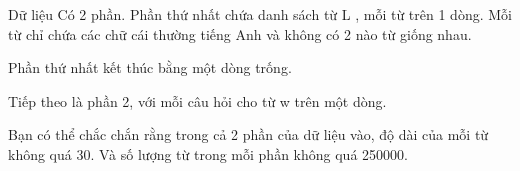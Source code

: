 Dữ liệu  
Có 2 phần. Phần thứ nhất chứa danh sách từ       L      , mỗi từ trên 1 dòng. Mỗi từ chỉ chứa các chữ cái thường tiếng Anh và không có 2 nào từ giống nhau.  

   Phần thứ nhất kết thúc bằng một dòng trống.  

   Tiếp theo là phần 2, với mỗi câu hỏi cho từ       w      trên một dòng.  

   Bạn có thể chắc chắn rằng trong cả 2 phần của dữ liệu vào, độ dài của mỗi từ không quá 30. Và số lượng từ trong mỗi phần không quá 250000.